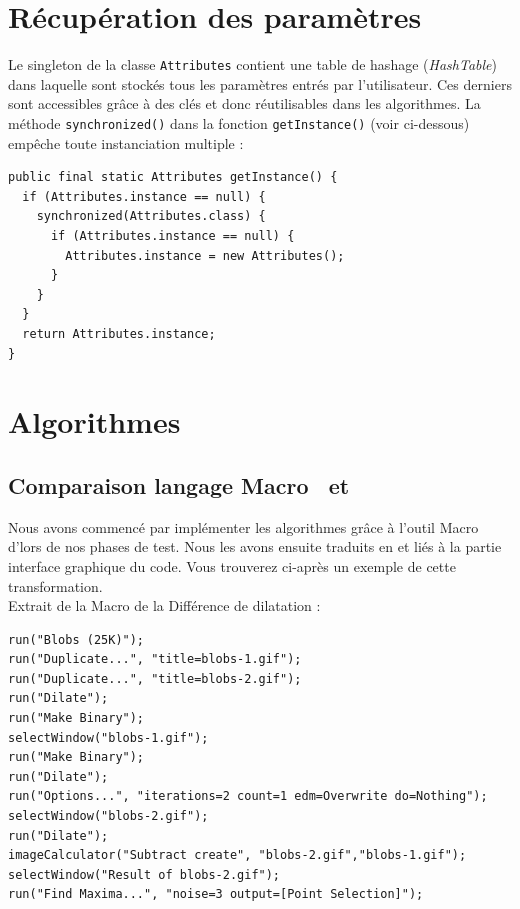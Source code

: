 \section{Récupération des paramètres}

Le singleton de la classe \texttt{Attributes} contient une table de hashage (\emph{HashTable}) dans laquelle sont stockés tous les paramètres entrés par l'utilisateur. Ces derniers sont accessibles grâce à des clés et donc réutilisables dans les algorithmes. La méthode  \texttt{synchronized()} dans la fonction \texttt{getInstance()} (voir ci-dessous) empêche toute instanciation multiple :

\begin{center}
\begin{fmpage}{11cm}
\begin{small}
\begin{lstlisting}
public final static Attributes getInstance() {
  if (Attributes.instance == null) {
    synchronized(Attributes.class) {
      if (Attributes.instance == null) {
        Attributes.instance = new Attributes();
      }
    }
  }
  return Attributes.instance;
}
\end{lstlisting}
\end{small}	
\end{fmpage}
\end{center}

\pagebreak

\section{Algorithmes}

\subsection{Comparaison langage Macro \imj ~et \java}

Nous avons commencé par implémenter les algorithmes grâce à l'outil Macro d'\imj lors de nos  phases de test. Nous les avons ensuite traduits en \java et liés à la partie interface graphique du code. Vous trouverez ci-après un exemple de cette transformation. \\

Extrait de la Macro de la Différence de dilatation :
\begin{center}
\begin{fmpage}{16cm}
\begin{small}
\begin{lstlisting}
run("Blobs (25K)");
run("Duplicate...", "title=blobs-1.gif");
run("Duplicate...", "title=blobs-2.gif");
run("Dilate");
run("Make Binary");
selectWindow("blobs-1.gif");
run("Make Binary");
run("Dilate");
run("Options...", "iterations=2 count=1 edm=Overwrite do=Nothing");
selectWindow("blobs-2.gif");
run("Dilate");
imageCalculator("Subtract create", "blobs-2.gif","blobs-1.gif");
selectWindow("Result of blobs-2.gif");
run("Find Maxima...", "noise=3 output=[Point Selection]");
\end{lstlisting}
\end{small}	
\end{fmpage}
\end{center}

